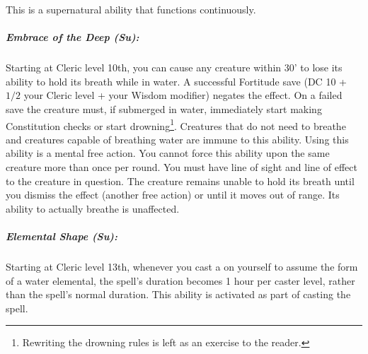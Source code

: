 This is a supernatural ability that functions continuously.
\subparagraph{Embrace of the Deep (Su):}
Starting at Cleric level 10th, you can cause any creature within 30' to lose its ability to hold its breath while in water.
A successful Fortitude save (DC 10 + $1/2$ your Cleric level + your Wisdom modifier) negates the effect.
On a failed save the creature must, if submerged in water, immediately start making Constitution checks or start drowning\footnote{Rewriting the drowning rules is left as an exercise to the reader.}.
Creatures that do not need to breathe and creatures capable of breathing water are immune to this ability.
Using this ability is a mental free action.
You cannot force this ability upon the same creature more than once per round. 
You must have line of sight and line of effect to the creature in question. 
The creature remains unable to hold its breath until you dismiss the effect (another free action) or until it moves out of range.
Its ability to actually breathe is unaffected.
\subparagraph{Elemental Shape (Su):}
Starting at Cleric level 13th, whenever you cast a  on yourself to assume the form of a water elemental, 
the spell's duration becomes 1 hour per caster level, rather than the spell's normal duration.
This ability is activated as part of casting the spell.
